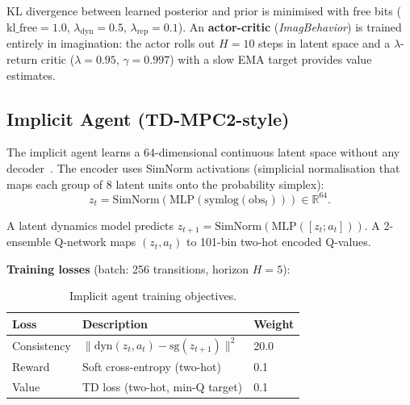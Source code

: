 \documentclass{article}
\begin{document}
KL divergence between learned posterior and prior is minimised with free bits
($\mathrm{kl\_free}=1.0$, $\lambda_{\mathrm{dyn}}=0.5$, $\lambda_{\mathrm{rep}}=0.1$).
An \textbf{actor-critic} (\textit{ImagBehavior}) is trained entirely in imagination:
the actor rolls out $H=10$ steps in latent space and a $\lambda$-return critic
($\lambda=0.95$, $\gamma=0.997$) with a slow EMA target provides value estimates.

\subsection{Implicit Agent (TD-MPC2-style)}
\label{sec:implicit}

The implicit agent learns a $64$-dimensional continuous latent space without any
decoder~\citep{hansen2024tdmpc2}.
The encoder uses SimNorm activations (simplicial normalisation that maps each group of
8 latent units onto the probability simplex):
\begin{equation}
  z_t = \mathrm{SimNorm}\!\left(\mathrm{MLP}(\mathrm{symlog}(\mathrm{obs}_t))\right)
  \in \mathbb{R}^{64}.
\end{equation}

A latent dynamics model predicts $z_{t+1} = \mathrm{SimNorm}(\mathrm{MLP}([z_t; a_t]))$.
A 2-ensemble Q-network maps $(z_t, a_t)$ to 101-bin two-hot encoded Q-values.

\textbf{Training losses} (batch: 256 transitions, horizon $H=5$):

\begin{table}[h]
\caption{Implicit agent training objectives.}
\label{tab:implicit-losses}
\vskip 0.1in
\begin{center}
\begin{small}
\begin{sc}
\begin{tabular}{lll}
\toprule
Loss        & Description                                      & Weight \\
\midrule
Consistency & $\|\mathrm{dyn}(z_t,a_t) - \mathrm{sg}(z_{t+1})\|^2$ & 20.0 \\
Reward      & Soft cross-entropy (two-hot)                     & 0.1 \\
Value       & TD loss (two-hot, min-Q target)                  & 0.1 \\
\bottomrule
\end{tabular}
\end{sc}
\end{small}
\end{center}
\vskip -0.1in
\end{table}
\end{document}
